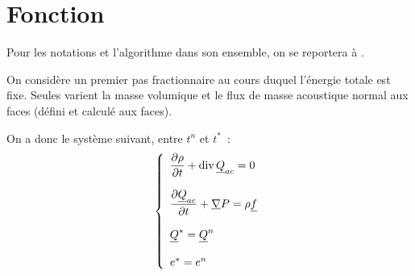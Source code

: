 
%
%
%
%


%
\vspace{1cm}
\section*{Fonction}

Pour les notations et l'algorithme dans son ensemble,
on se reportera \`a .

On consid\`ere un premier pas fractionnaire au cours duquel l'\'energie totale
est fixe. Seules varient la masse volumique et le flux de masse acoustique
normal aux faces (d\'efini et calcul\'e aux faces).

On a donc le syst\`eme suivant, entre $t^n$ et $t^*$~:
\begin{equation}\label{Cfbl_Cfmsvl_eq_acoustique_cfmsvl}
\left\{\begin{array}{l}

\displaystyle\frac{\partial\rho}{\partial t}+\text{div}\,{\underline{Q}_{ac}} = 0 \\
\\
\displaystyle\frac{\partial\underline{Q}_{ac}}{\partial t}+\underline{\nabla}{P} =
\rho \underline{f}\\
\\
\underline{Q}^*=\underline{Q}^n\\
\\
e^*=e^n\\

\end{array}\right.
\end{equation}

